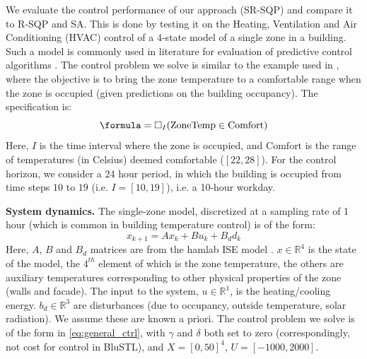 
We evaluate the control performance of our approach (SR-SQP) and compare it to R-SQP and SA. %
This is done by testing it on the Heating, Ventilation and Air Conditioning (HVAC) control of a 4-state model of a single zone in a building. Such a model is commonly used in literature for evaluation of predictive control algorithms \cite{Jain2016}. The control problem we solve is similar to the example used in \cite{Raman14_MPCSTL}, where the objective is to bring the zone temperature to a comfortable range when the zone is occupied (given predictions on the building occupancy). The specification is:
\begin{equation}
\label{eq:BldgSpec}
\formula = \always_I(\text{ZoneTemp} \in \text{Comfort})
\end{equation}
Here, $I$ is the time interval where the zone is occupied, and $\text{Comfort}$ is the range of temperatures (in Celsius) deemed comfortable ($[22,28]$). For the control horizon, we consider a 24 hour period, in which the building is occupied from time steps $10$ to $19$ (i.e. $I=[10,19]$), i.e. a 10-hour workday. 

\textbf{System dynamics.} The single-zone model, discretized at a sampling rate of 1 hour (which is common in building temperature control) is of the form:
\begin{equation}
\label{eq:bldg_dyn}
x_{k+1} = Ax_{k}+Bu_k+B_dd_k
\end{equation}
Here, $A$, $B$ and $B_d$ matrices are from the hamlab ISE model \cite{VanSchijndel2005}. $x \in \mathbb{R}^4$ is the state of the model, the $4^{th}$ element of which is the zone temperature, the others are auxiliary temperatures corresponding to other physical properties of the zone (walls and facade). The input to the system, $u \in \mathbb{R}^1$, is the heating/cooling energy. $b_d \in \mathbb{R}^3$ are disturbances (due to occupancy, outside temperature, solar radiation). We assume these are known a priori.
The control problem we solve is of the form in \eqref{eq:general_ctrl}, with $\gamma$ and $\delta$ both set to zero (correspondingly, not cost for control in BluSTL), and $X=[0,50]^4$, $U=[-1000,2000]$.

